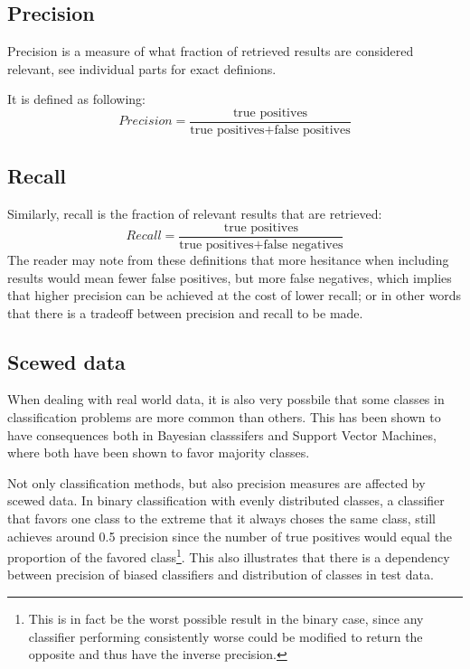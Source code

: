 \documentclass[a4paper,11pt]{kth-mag}
\begin{document}
\subsection{Precision}
Precision is a measure of what fraction of retrieved results are considered relevant, see individual parts for exact definions.

It is defined as following:
\begin{equation} \label{eq:precision}
Precision = \frac{\text {true positives}}{\text{true positives} + \text{false positives}}
\end{equation}

\subsection{Recall}
Similarly, recall is the fraction of relevant results that are retrieved:
$$Recall = \frac{\text {true positives}}{\text{true positives} + \text{false negatives}}$$
The reader may note from these definitions that more hesitance when including results would mean fewer false positives, but more false negatives, which implies that higher precision can be achieved at the cost of lower recall; or in other words that there is a tradeoff between precision and recall to be made.



\subsection{Scewed data}
\label{subsec:bias}
When dealing with real world data, it is also very possbile that some classes in classification problems are more common than others. This has been shown to have consequences both in Bayesian classsifers\cite{rennie2003bias} and Support Vector Machines\cite{svm_bias}, where both have been shown to favor majority classes\cite{rennie2003bias, svm_bias}.

Not only classification methods, but also precision measures are affected by scewed data. In binary classification with evenly distributed classes, a classifier that favors one class to the extreme that it always choses the same class, still achieves around 0.5 precision since the number of true positives would equal the proportion of the favored class\footnote{This is in fact be the worst possible result in the binary case, since any classifier performing consistently worse could be modified to return the opposite and thus have the inverse precision.}. This also illustrates that there is a dependency between precision of biased classifiers and distribution of classes in test data.
\end{document}
